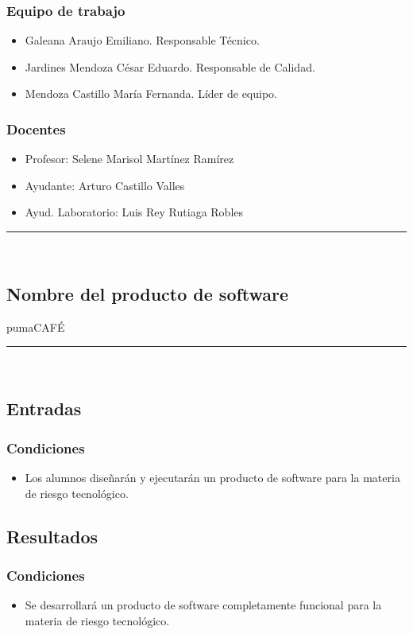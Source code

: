 \documentclass{article}
\begin{document}
\subsubsection*{Equipo de trabajo}
\begin{itemize}
\item Galeana Araujo Emiliano. Responsable Técnico.
\item Jardines Mendoza César Eduardo. Responsable de Calidad.
\item Mendoza Castillo María Fernanda. Líder de equipo.
\end{itemize}

\subsubsection*{Docentes}
\begin{itemize}
\item Profesor: Selene Marisol Martínez Ramírez
\item Ayudante: Arturo Castillo Valles
\item Ayud. Laboratorio: Luis Rey Rutiaga Robles
\end{itemize}
\rule{0.8\textwidth}{.8pt}\\

\subsection*{Nombre del producto de software}
pumaCAFÉ\\
\rule{0.8\textwidth}{.8pt}\\

\subsection*{Entradas}
\subsubsection*{Condiciones}
\begin{itemize}
\item Los alumnos diseñarán y ejecutarán un producto de software para la materia
  de riesgo tecnológico.
\end{itemize}

\subsection*{Resultados}
\subsubsection*{Condiciones}
\begin{itemize}
\item Se desarrollará un producto de software completamente funcional para la
  materia de riesgo tecnológico.
\end{itemize}
\end{document}

